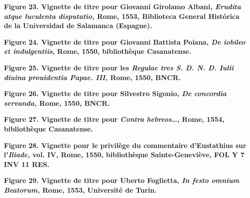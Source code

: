 \documentclass[12pt,twoside,openany]{book}
\begin{document}
\begin{center}
\par\small \textbf{Figure 23. Vignette de titre pour Giovanni Girolamo Albani, \textit{Erudita atque luculenta disputatio, }Rome, 1553, Biblioteca General Histórica de la Universidad de Salamanca (Espagne).}
\end{center}

\begin{center}
\par\small \textbf{Figure 24. Vignette de titre pour Giovanni Battista Poiana, \textit{De iobileo et indulgentiis}, Rome, 1550, bibliothèque Casanatense.}
\end{center}

\begin{center}
\par\small \textbf{Figure 25. Vignette de titre pour les \textit{Regulae tres S. D. N. D. Iulii diuina prouidentia Papae. III, }Rome, 1550, BNCR.}
\end{center}

\begin{center}
\par\small \textbf{Figure 26. Vignette de titre pour Silvestro Sigonio,\textit{ De concordia servanda,} Rome, 1550, BNCR.}
\end{center}

\begin{center}
\par\small \textbf{Figure 27. Vignette de titre pour \textit{Contra hebreos}…, Rome, 1554, bibliothèque Casanatense.}
\end{center}

\begin{center}
\par\small \textbf{Figure 28. Vignette pour le privilège du commentaire d’Eustathius sur l’\textit{Iliade, }vol. IV, Rome, 1550, bibliothèque Sainte-Geneviève, FOL Y 7 INV 11 RES.}
\end{center}

\begin{center}
\par\small \textbf{Figure 29. Vignette de titre pour Uberto Foglietta, \textit{In festo omnium Beatorum, }Rome, 1553, Université de Turin.}
\end{center}
\end{document}
